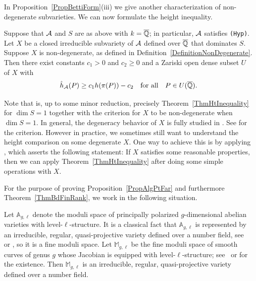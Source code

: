 In Proposition~\ref{PropBettiForm}(iii) we give another characterization of non-degenerate
subvarieties. We can now formulate the height inequality. 

\begin{theorem}\label{ThmHtInequality}
  Suppose that $\mathcal{A}$ and $S$ are as above with $k={\overline{\mathbb{Q}}}$;
  in particular, $\mathcal{A}$ satisfies {\tt (Hyp)}.
  Let $X$ be a closed irreducible subvariety of $\mathcal{A}$
  defined over ${\overline{\mathbb{Q}}}$ that dominates $S$.   Suppose $X$ is non-degenerate,
  as defined in Definition~\ref{DefinitionNonDegenerate}. Then there
  exist constants $c_1>0$ and $c_2\ge 0$ and a Zariski open dense subset
  $U$ of $X$ with 
  \begin{equation*}
    \hat{h}_{\mathcal{A}}(P) \ge c_1 h( \pi(P) ) - c_2 \quad \text{for all}\quad P \in U({\overline{\mathbb{Q}}}).
  \end{equation*}
\end{theorem}


Note that \cite[Theorem~1.4]{GaoHab} is, up to some minor reduction,
precisely Theorem~\ref{ThmHtInequality} for $\dim S = 1$ together with
the criterion for $X$ to be non-degenerate when $\dim S = 1$. In general, the degeneracy behavior of $X$ is fully studied in \cite{GaoBettiRank}. See \cite[Theorem~1.1]{GaoBettiRank} for the criterion. However in practice, we sometimes still want to understand the height comparison on some degenerate $X$. One way to achieve this is by applying \cite[Theorem~1.3]{GaoBettiRank}, which asserts the following statement: If $X$ satisfies some reasonable properties, then we can apply Theorem~\ref{ThmHtInequality} after doing some simple operations with $X$. 

For the purpose of proving Proposition~\ref{PropAlgPtFar} and
furthermore Theorem~\ref{ThmBdFinRank}, we work in the following
situation. 



Let $\mathbb{A}_{g,\ell}$
denote the moduli space of principally polarized $g$-dimensional
abelian varieties with level-$\ell$-structure. It is
a classical fact that $\mathbb{A}_{g,\ell}$ is represented by an
 irreducible, regular, quasi-projective
variety defined over a number field,
see~\cite[Theorem~7.9 and below]{MFK:GIT94} or \cite[Theorem 1.9]{OortSteenbrink}, so it is a
fine moduli space.
Let $\mathbb{M}_{g,\ell}$ be the fine moduli space of smooth curves of genus
$g$ whose Jacobian is equipped with  level-$\ell$-structure;
see~\cite[(5.14)]{DM:irreducibility} or \cite[Theorem
1.8]{OortSteenbrink} for the existence.
Then $\mathbb{M}_{g,\ell}$ is an irreducible, regular, quasi-projective
variety defined over a number field. 

